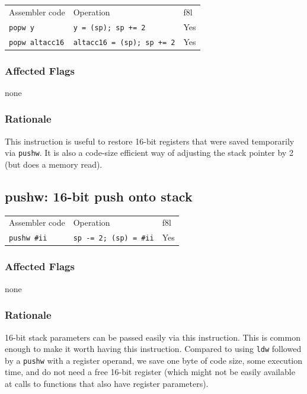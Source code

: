\documentclass{book}
\begin{document}
\begin{tabular}{l l l}
Assembler code         & Operation                         & f8l \\
\texttt{popw y}        & \texttt{y = (sp); sp += 2}        & Yes \\
\texttt{popw altacc16} & \texttt{altacc16 = (sp); sp += 2} & Yes \\
\end{tabular}

\subsubsection*{Affected Flags}

none

\subsubsection*{Rationale}

This instruction is useful to restore 16-bit registers that were saved temporarily via \texttt{pushw}. It is also a code-size efficient way of adjusting the stack pointer by 2 (but does a memory read).


\subsection{pushw: 16-bit push onto stack}

\begin{tabular}{l l l}
Assembler code      & Operation                     & f8l \\
\texttt{pushw \#ii} & \texttt{sp -= 2; (sp) = \#ii} & Yes \\
\end{tabular}

\subsubsection*{Affected Flags}

none

\subsubsection*{Rationale}

16-bit stack parameters can be passed easily via this instruction. This is common enough to make it worth having this instruction. Compared to using \texttt{ldw} followed by a \texttt{pushw} with a register operand, we save one byte of code size, some execution time, and do not need a free 16-bit register (which might not be easily available at calls to functions that also have register parameters).
\end{document}
